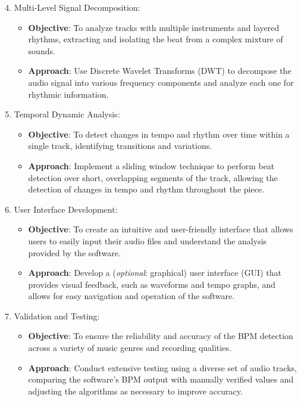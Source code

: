 \documentclass[a4paper,12pt,oneside]{article}
\def\tightlist{%
  \setlength{\itemsep}{0pt}\setlength{\parskip}{0pt}}
\begin{document}
\begin{enumerate}
\setcounter{enumi}{3}
\item
  Multi-Level Signal Decomposition:
  \begin{itemize}
  \tightlist
  \item
    \textbf{Objective}: To analyze tracks with multiple instruments and
    layered rhythms, extracting and isolating the beat from a complex
    mixture of sounds.
  \item
    \textbf{Approach}: Use Discrete Wavelet Transforms (DWT) to decompose
    the audio signal into various frequency components and analyze each
    one for rhythmic information.
  \end{itemize}

\setcounter{enumi}{4}
\item
  Temporal Dynamic Analysis:
  \begin{itemize}
  \tightlist
  \item
    \textbf{Objective}: To detect changes in tempo and rhythm over time
    within a single track, identifying transitions and variations.
  \item
    \textbf{Approach}: Implement a sliding window technique to perform
    beat detection over short, overlapping segments of the track, allowing
    the detection of changes in tempo and rhythm throughout the piece.
  \end{itemize}

\setcounter{enumi}{5}
\item
  User Interface Development:
  \begin{itemize}
  \tightlist
  \item
    \textbf{Objective}: To create an intuitive and user-friendly interface
    that allows users to easily input their audio files and understand the
    analysis provided by the software.
  \item
    \textbf{Approach}: Develop a (\emph{optional}: graphical) user
    interface (GUI) that provides visual feedback, such as waveforms and
    tempo graphs, and allows for easy navigation and operation of the
    software.
  \end{itemize}

\setcounter{enumi}{6}
\item
  Validation and Testing:
  \begin{itemize}
  \tightlist
  \item
    \textbf{Objective}: To ensure the reliability and accuracy of the BPM
    detection across a variety of music genres and recording qualities.
  \item
    \textbf{Approach}: Conduct extensive testing using a diverse set of
    audio tracks, comparing the software's BPM output with manually
    verified values and adjusting the algorithms as necessary to improve
    accuracy.
  \end{itemize}
\end{enumerate}
\end{document}
